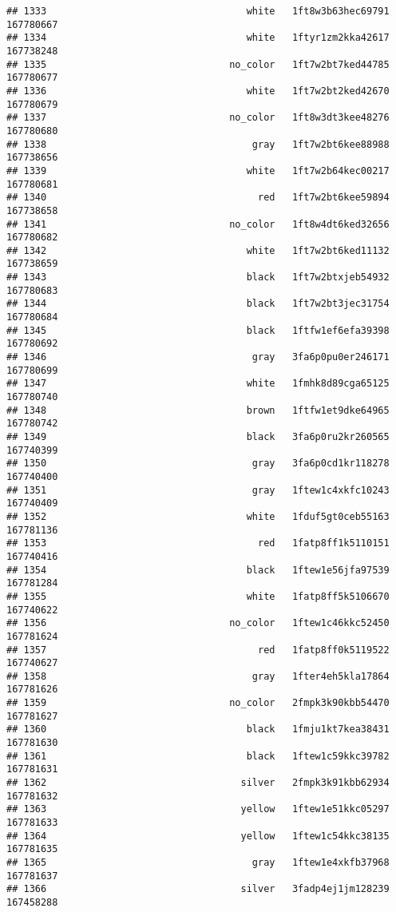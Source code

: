 \documentclass[
]{article}
\begin{document}
\begin{verbatim}
## 1333                                   white   1ft8w3b63hec69791 167780667
## 1334                                   white   1ftyr1zm2kka42617 167738248
## 1335                                no_color   1ft7w2bt7ked44785 167780677
## 1336                                   white   1ft7w2bt2ked42670 167780679
## 1337                                no_color   1ft8w3dt3kee48276 167780680
## 1338                                    gray   1ft7w2bt6kee88988 167738656
## 1339                                   white   1ft7w2b64kec00217 167780681
## 1340                                     red   1ft7w2bt6kee59894 167738658
## 1341                                no_color   1ft8w4dt6ked32656 167780682
## 1342                                   white   1ft7w2bt6ked11132 167738659
## 1343                                   black   1ft7w2btxjeb54932 167780683
## 1344                                   black   1ft7w2bt3jec31754 167780684
## 1345                                   black   1ftfw1ef6efa39398 167780692
## 1346                                    gray   3fa6p0pu0er246171 167780699
## 1347                                   white   1fmhk8d89cga65125 167780740
## 1348                                   brown   1ftfw1et9dke64965 167780742
## 1349                                   black   3fa6p0ru2kr260565 167740399
## 1350                                    gray   3fa6p0cd1kr118278 167740400
## 1351                                    gray   1ftew1c4xkfc10243 167740409
## 1352                                   white   1fduf5gt0ceb55163 167781136
## 1353                                     red   1fatp8ff1k5110151 167740416
## 1354                                   black   1ftew1e56jfa97539 167781284
## 1355                                   white   1fatp8ff5k5106670 167740622
## 1356                                no_color   1ftew1c46kkc52450 167781624
## 1357                                     red   1fatp8ff0k5119522 167740627
## 1358                                    gray   1fter4eh5kla17864 167781626
## 1359                                no_color   2fmpk3k90kbb54470 167781627
## 1360                                   black   1fmju1kt7kea38431 167781630
## 1361                                   black   1ftew1c59kkc39782 167781631
## 1362                                  silver   2fmpk3k91kbb62934 167781632
## 1363                                  yellow   1ftew1e51kkc05297 167781633
## 1364                                  yellow   1ftew1c54kkc38135 167781635
## 1365                                    gray   1ftew1e4xkfb37968 167781637
## 1366                                  silver   3fadp4ej1jm128239 167458288

\end{verbatim}
\end{document}
